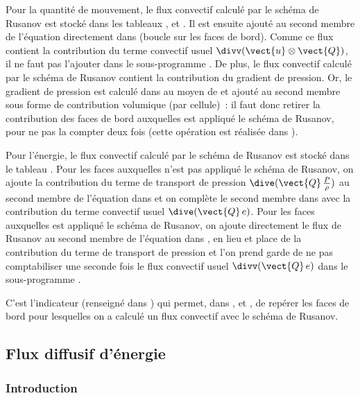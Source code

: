 Pour la quantit\'e de mouvement, le flux convectif calcul\'e par le sch\'ema de
Rusanov  est stock\'e dans les tableaux
,  et
. Il est ensuite ajout\'e au second membre de
l'\'equation directement dans  (boucle sur les faces de bord).
Comme ce flux contient la contribution du terme convectif usuel
$\divv(\vect{u}\otimes\vect{Q})$, il ne faut pas l'ajouter dans
le sous-programme .
De plus, le flux convectif calcul\'e par le sch\'ema de Rusanov
contient la contribution du
gradient de pression. Or, le gradient de pression est calcul\'e dans
 au moyen de  et ajout\'e au second membre
sous forme de contribution volumique (par cellule)~: il faut donc retirer
la contribution des faces de bord auxquelles est appliqu\'e le sch\'ema de
Rusanov, pour ne pas la compter deux fois (cette op\'eration est r\'ealis\'ee
dans ).

Pour l'\'energie, le flux convectif calcul\'e par le sch\'ema de
Rusanov est stock\'e dans le tableau
. Pour les faces auxquelles n'est pas
appliqu\'e le sch\'ema de Rusanov, on ajoute la contribution
du terme de transport de pression $\dive(\vect{Q}\,\frac{P}{\rho})$
au second membre de l'\'equation dans 
et on compl\`ete le second membre dans  avec la contribution du
terme convectif usuel $\dive(\vect{Q}\,e)$. Pour les faces auxquelles est
appliqu\'e le sch\'ema de Rusanov, on ajoute directement le flux de Rusanov au second
membre de l'\'equation dans , en lieu et place de la contribution
du terme de transport de pression et l'on prend garde de ne pas
comptabiliser une seconde fois le flux convectif usuel
$\divv(\vect{Q}\,e)$ dans le sous-programme .

C'est l'indicateur 
(renseign\'e dans ) qui permet, dans ,
 et ,
de rep\'erer les faces de bord pour lesquelles on a calcul\'e
un flux convectif avec le sch\'ema de Rusanov.


\subsection*{Flux diffusif d'\'energie}

\subsubsection*{Introduction}

